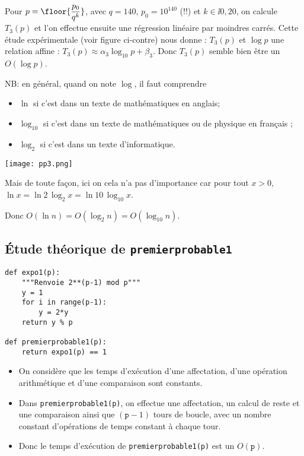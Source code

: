 \begin{minipage}[c]{.48\linewidth}
Pour $p = \floor{\dfrac{p_0}{q^k}}$, avec $q = 140$, $p_0 = 10^{140}$ (!!) et $k\in\ii{0,20}$, on calcule $T_3(p)$ et l'on effectue ensuite une régression linéaire par moindres carrés. Cette étude expérimentale 
(voir figure ci-contre) 
nous donne :
$T_{3}(p)$ et $\log p$ une relation affine :
$  T_{3}(p) \approx \alpha_{3}\log_{10} p + \beta_{3}$. Donc $T_{3}(p)$ semble bien être un $O(\log p)$.

NB: en général, quand on note $\log$, il faut comprendre
\begin{itemize}
\item $\ln$ si c'est dans un texte de mathématiques en anglais;
\item $\log_{10}$ si c'est dans un texte de mathématiques ou de
  physique en français ;
\item $\log_{2}$ si c'est dans un texte d'informatique.
\end{itemize}

\end{minipage} \hfill
\begin{minipage}[c]{.48\linewidth}
  \begin{center}
    \texttt{[image: pp3.png]}
  \end{center}
\end{minipage}

Mais de toute façon, ici on cela n'a pas d'importance car pour tout $x>0$, $ \ln x = \ln 2 \, \log_{2} x = \ln 10\, \log_{10}x$.

Donc $ O(\ln n) = O(\log_{2} n) = O(\log_{10} n)$.

\subsection{Étude théorique de \texttt{premierprobable1}}


\begin{lstlisting}
def expo1(p):
    """Renvoie 2**(p-1) mod p"""
    y = 1
    for i in range(p-1):
        y = 2*y
    return y % p

def premierprobable1(p):
    return expo1(p) == 1
\end{lstlisting}

\begin{itemize}
\item[\textbullet] On considère que les temps d'exécution d'une affectation, d'une
  opération arithmétique et d'une comparaison sont constants.
\item[\textbullet] Dans \texttt{premierprobable1(p)}, on effectue une affectation, un
  calcul de reste et
  une comparaison ainsi que $(\texttt{p}-1)$ tours de boucle, avec un
  nombre constant d'opérations de temps constant à chaque tour.
\item[\textbullet] Donc le temps d'exécution de \texttt{premierprobable1(p)} est un
  $O(\texttt{p})$.
\end{itemize}


